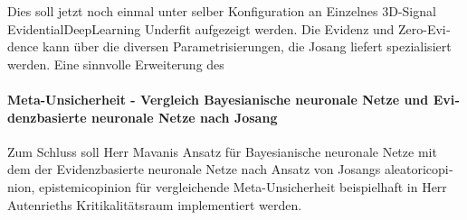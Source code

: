 \begin{otherlanguage}{ngerman}
{Dies soll jetzt noch einmal unter selber Konfiguration an \glqq{}Einzelnes 3D-Signal \gls{EvidentialDeepLearning} Underfit\grqq{} aufgezeigt werden. Die Evidenz und \glqq{}Zero-Evidence\grqq{} kann über die diversen Parametrisierungen, die Josang liefert spezialisiert werden. Eine sinnvolle Erweiterung des 











\paragraph{Meta-Unsicherheit - Vergleich \gls{Bayesianische neuronale Netze} und \gls{Evidenzbasierte neuronale Netze} nach Josang} Zum Schluss soll Herr Mavanis Ansatz für \gls{Bayesianische neuronale Netze} mit dem der \gls{Evidenzbasierte neuronale Netze} nach Ansatz von Josangs \gls{aleatoricopinion}, \gls{epistemicopinion} für vergleichende Meta-Unsicherheit beispielhaft in Herr Autenrieths Kritikalitätsraum implementiert werden. 



}
\end{otherlanguage}
